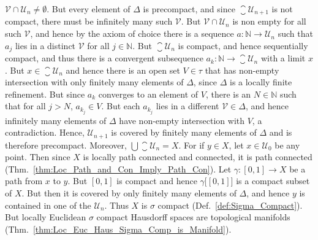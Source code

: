 \documentclass{article}                                                        %
\begin{document}
\begin{solution}
            $\mathcal{V}\cap\mathcal{U}_{n}\ne\emptyset$. But every element of
            $\Delta$ is precompact, and since $\closure{\mathcal{U}_{n+1}}$ is
            not compact, there must be infinitely many such $\mathcal{V}$. But
            $\mathcal{V}\cap\mathcal{U}_{n}$ is non
            empty for all such $\mathcal{V}$, and hence by the axiom of choice
            there is a sequence $a:\mathbb{N}\rightarrow\mathcal{U}_{n}$ such
            that $a_{j}$ lies in a distinct $\mathcal{V}$ for all
            $j\in\mathbb{N}$. But $\closure{\mathcal{U}_{n}}$ is compact, and
            hence sequentially compact, and thus there is a convergent
            subsequence $a_{k}:\mathbb{N}\rightarrow\closure{\mathcal{U}_{n}}$
            with a limit $x$. But $x\in\closure{\mathcal{U}_{n}}$ and hence
            there is an open set $V\in\tau$ that has non-empty intersection with
            only finitely many elements of $\Delta$, since $\Delta$ is a locally
            finite refinement. But since $a_{k}$ converges to an element of $V$,
            there is an $N\in\mathbb{N}$ such that for all $j>N$,
            $a_{k_{j}}\in{V}$. But each $a_{k_{j}}$ lies in a different
            $\mathcal{V}\in\Delta$, and hence infinitely many elements of
            $\Delta$ have non-empty intersection with $V$, a contradiction.
            Hence, $\mathcal{U}_{n+1}$ is covered by finitely many elements of
            $\Delta$ and is therefore precompact. Moreover,
            $\bigcup\closure{\mathcal{U}_{n}}=X$. For if $y\in{X}$, let
            $x\in\mathcal{U}_{0}$ be any point. Then since $X$ is locally path
            connected and connected, it is path connected
            (Thm.~\ref{thm:Loc_Path_and_Con_Imply_Path_Con}).
            Let $\gamma:[0,1]\rightarrow{X}$ be a path from $x$ to $y$. But
            $[0,1]$ is compact and hence $\gamma\big[[0,1]\big]$ is a compact
            subset of $X$. But then it is covered by only finitely many elements
            of $\Delta$, and hence $y$ is contained in one of the
            $\mathcal{U}_{n}$. Thus $X$ is $\sigma$ compact
            (Def.~\ref{def:Sigma_Compact}). But locally Euclidean $\sigma$
            compact Hausdorff spaces are topological manifolds
            (Thm.~\ref{thm:Loc_Euc_Haus_Sigma_Comp_is_Manifold}).
        \end{solution}
\end{document}
